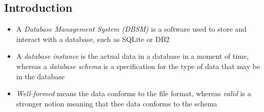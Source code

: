 \documentclass[a4paper]{article}
\begin{document}
\subsection{Introduction}
\begin{itemize}
	\item A \emph{Database Management System (DBSM)} is a software used to store and interact with a database, such as SQLite or DB2
    \item A \emph{database instance} is the actual data in a database in a moment of time, whereas a \emph{database schema} is a specification for the type of data that may be in the database
    \item \emph{Well-formed} means the data conforms to the file format, whereas \emph{valid} is a stronger notion meaning that thee data conforms to the schema
\end{itemize}
\end{document}

